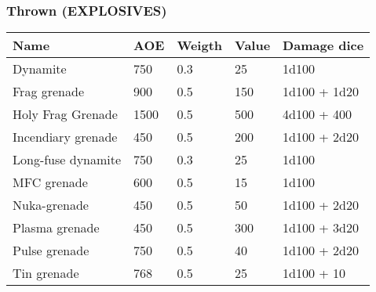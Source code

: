 
\subsubsection{Thrown (EXPLOSIVES)}
\begin{longtable}{|p{4cm}|p{1.5cm}|p{1.5cm}|p{2cm}|p{4cm}|}
\hline
\bfseries Name & \bfseries AOE & \bfseries Weigth & \bfseries Value & \bfseries Damage dice \\
\hline
\endhead
Dynamite  & 750 & 0.3  & 25 & 1d100 \\
Frag grenade  & 900 & 0.5  & 150 & 1d100 + 1d20 \\
Holy Frag Grenade & 1500 & 0.5  & 500 & 4d100 + 400 \\
Incendiary grenade  & 450 & 0.5  & 200 & 1d100 + 2d20 \\
Long-fuse dynamite  & 750 & 0.3  & 25 & 1d100 \\
MFC grenade  & 600 & 0.5  & 15 & 1d100 \\
Nuka-grenade  & 450 & 0.5  & 50 & 1d100 + 2d20 \\
Plasma grenade  & 450 & 0.5  & 300 & 1d100 + 3d20 \\
Pulse grenade  & 750 & 0.5  & 40 & 1d100 + 2d20 \\
Tin grenade  & 768 & 0.5  & 25 & 1d100 + 10 \\
\hline
\end{longtable}
